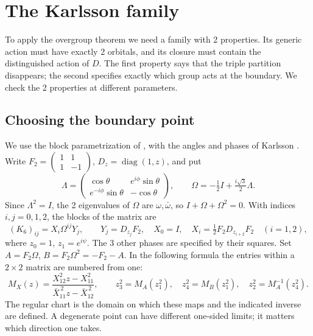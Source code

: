 \documentclass[11pt,a4paper]{amsart}
\begin{document}
\section{The Karlsson family}\label{sec:karlsson}

To apply the overgroup theorem we need a family with 2 properties. Its generic action must have exactly 2 orbitals, and its closure must contain the distinguished action of $D$. The first property says that the triple partition disappears; the second specifies exactly which group acts at the boundary. We check the 2 properties at different parameters.

\subsection{Choosing the boundary point}
We use the block parametrization of \cite[Section~7]{bo}, with the angles and phases of Karlsson \cite{kar}. Write $F_2=\left(\begin{smallmatrix}1&1\\1&-1\end{smallmatrix}\right)$, $D_z=\operatorname{diag}(1,z)$, and put
\[
 \Lambda=\begin{pmatrix}
 \cos\theta&e^{i\phi}\sin\theta\\ e^{-i\phi}\sin\theta&-\cos\theta
 \end{pmatrix},\qquad
 \Omega=-\tfrac12 I+\tfrac{i\sqrt3}{2}\Lambda .
\]
Since $\Lambda^2=I$, the 2 eigenvalues of $\Omega$ are $\omega,\bar\omega$, so $I+\Omega+\Omega^2=0$. With indices $i,j=0,1,2$, the blocks of the matrix are
\[
 (K_6)_{ij}=X_i\Omega^{ij}Y_j,\qquad
 Y_j=D_{z_j}F_2,\quad X_0=I,\quad
 X_i=\tfrac12 F_2D_{z_{i+2}}F_2\quad(i=1,2),
\]
where $z_0=1$, $z_1=e^{i\psi}$. The 3 other phases are specified by their squares. Set $A=F_2\Omega$, $B=F_2\Omega^2=-F_2-A$. In the following formula the entries within a $2\times2$ matrix are numbered from one:
\[
 M_X(z)=\frac{X_{12}^2 z-X_{11}^2}{\bar X_{11}^{\,2}z-\bar X_{12}^{\,2}},
 \qquad
 z_3^2=M_A(z_1^2),\quad z_4^2=M_B(z_1^2),
 \quad z_2^2=M_A^{-1}(z_4^2).
\]
The regular chart is the domain on which these maps and the indicated inverse are defined. A degenerate point can have different one-sided limits; it matters which direction one takes.
\end{document}

